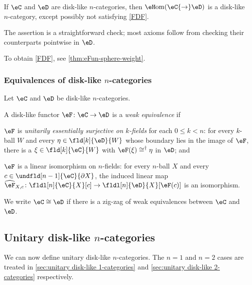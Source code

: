 \documentclass[12pt,reqno]{amsart}
\newcommand{\eFun}{{\eH}\mathrm{om}}
\newcommand{\C}{\eC}
\newcommand{\D}{\eD}
\newcommand{\defn}[1]{\emph{#1}}
\renewcommand{\star}{\dag}
\begin{document}
\begin{proposition}
  \label{lem:eFun disk-like}
  If $\C$ and $\D$ are disk-like $n$-categories, then $\eFun(\C{\to}\D)$ is a disk-like $n$-category, except possibly not satisfying \ref{FDF}.
\end{proposition}

\begin{pf}
The assertion is a straightforward check; most axioms follow from checking their counterparts pointwise in $\D$.
\end{pf}

To obtain \ref{FDF}, see \cref{thm:eFun-sphere-weight}.

\subsubsection{Equivalences of disk-like \texorpdfstring{$n$}{n}-categories}
\label{sec:equivalences-general-n}
Let $\C$ and $\D$ be disk-like $n$-categories. 

\begin{definition} 
\label{def:wkequiv}
A disk-like functor $\eF\colon\C\to\D$ is a \defn{weak equivalence} if
\begin{lst}
  \item[(WE$k$)]\label{WEgenk} $\eF$ is \defn{unitarily essentially surjective on $k$-fields} for each $0\leq k<n$: for every $k$-ball $W$ and every $\eta\in\fld[k]{\D}{W}$ whose boundary lies in the image of $\eF$, there is a $\xi\in\fld[k]{\C}{W}$ with $\eF(\xi)\cong^\star\eta$ in $\D$; and
  \item[(WE$n$)]\label{WEgenn} $\eF$ is a linear isomorphism on $n$-fields: for every $n$-ball $X$ and every $c\in\undfld[n-1]{\C}{\partial X}$, the induced linear map $\widehat{\eF}_{X,c}\colon\fldl[n]{\C}{X}[c]\to\fldl[n]{\D}{X}[\eF(c)]$ is an isomorphism.
\end{lst}
We write $\C\cong\D$ if there is a zig-zag of weak equivalences between $\C$ and $\D$.
\end{definition}

\subsection{Unitary disk-like \texorpdfstring{$n$}{n}-categories}
\label{sec:unitary disk-like n-categories}

We can now define unitary disk-like $n$-categories. The $n=1$ and $n=2$ cases are treated in \cref{sec:unitary disk-like 1-categories} and \cref{sec:unitary disk-like 2-categories} respectively.
\end{document}
